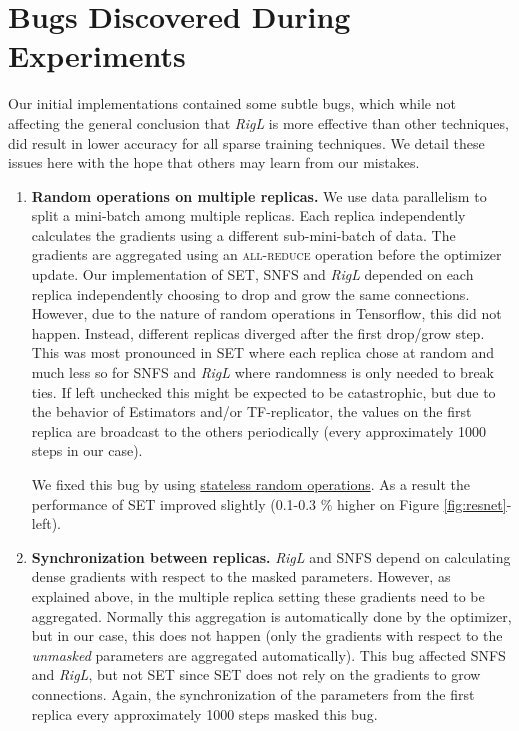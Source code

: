 \documentclass{article}
\begin{document}
\section{Bugs Discovered During Experiments}
Our initial implementations contained some subtle bugs, which while not affecting the general conclusion that {\em RigL} is more effective than other techniques, did result in lower accuracy for all sparse training techniques.  We detail these issues here with the hope that others may learn from our mistakes.

\begin{enumerate}
    \item \textbf{Random operations on multiple replicas.}  We use data parallelism to split a mini-batch among multiple replicas.  Each replica independently calculates the gradients using a different sub-mini-batch of data. The gradients are aggregated using an \textsc{all-reduce} operation before the optimizer update. Our implementation of SET, SNFS and {\em RigL} depended on each replica independently choosing to drop and grow the same connections.  However, due to the nature of random operations in Tensorflow, this did not happen.  Instead, different replicas diverged after the first drop/grow step.  This was most pronounced in SET where each replica chose at random and much less so for SNFS and {\em RigL} where randomness is only needed to break ties. If left unchecked this might be expected to be catastrophic, but due to the behavior of Estimators and/or TF-replicator, the values on the first replica are broadcast to the others periodically (every approximately 1000 steps in our case).

     We fixed this bug by using \href{https://www.tensorflow.org/api_docs/python/tf/random/stateless_uniform}{stateless random operations}. As a result the performance of SET improved slightly (0.1-0.3 \% higher on Figure \ref{fig:resnet}-left).

    \item \textbf{Synchronization between replicas.} {\em RigL} and SNFS depend on calculating dense gradients with respect to the masked parameters. However, as explained above, in the multiple replica setting these gradients need to be aggregated. Normally this aggregation is automatically done by the optimizer, but in our case, this does not happen (only the gradients with respect to the \emph{unmasked} parameters are aggregated automatically).  This bug affected SNFS and {\em RigL}, but not SET since SET does not rely on the gradients to grow connections.  Again, the synchronization of the parameters from the first replica every approximately 1000 steps masked this bug.


\end{enumerate}
\end{document}
